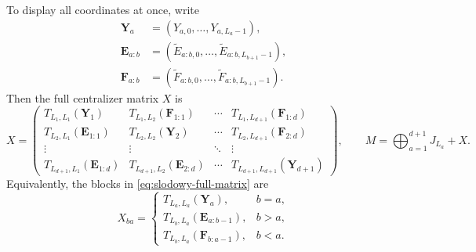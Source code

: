 \documentclass[12pt,a4paper]{article}
\begin{document}
To display all coordinates at once, write
\begin{equation}
 \begin{aligned}
 \mathbf Y_a&=(Y_{a,0},\ldots,Y_{a,L_a-1}),\\
 \mathbf E_{a:b}&=(\tilde{E}_{a:b,0},\ldots,\tilde{E}_{a:b,L_{b+1}-1}),\\
 \mathbf F_{a:b}&=(\tilde{F}_{a:b,0},\ldots,\tilde{F}_{a:b,L_{b+1}-1}).
 \end{aligned}
 \label{eq:slodowy-coordinate-vectors}
\end{equation}
Then the full centralizer matrix $X$ is
\begin{equation}
 X=\begin{pmatrix}
 T_{L_1,L_1}(\mathbf Y_1)&T_{L_1,L_2}(\mathbf F_{1:1})&\cdots&T_{L_1,L_{d+1}}(\mathbf F_{1:d})\\
 T_{L_2,L_1}(\mathbf E_{1:1})&T_{L_2,L_2}(\mathbf Y_2)&\cdots&T_{L_2,L_{d+1}}(\mathbf F_{2:d})\\
 \vdots&\vdots&\ddots&\vdots\\
 T_{L_{d+1},L_1}(\mathbf E_{1:d})&T_{L_{d+1},L_2}(\mathbf E_{2:d})&\cdots&T_{L_{d+1},L_{d+1}}(\mathbf Y_{d+1})
 \end{pmatrix},
 \qquad M=\bigoplus_{a=1}^{d+1}J_{L_a}+X.
 \label{eq:slodowy-full-matrix}
\end{equation}
Equivalently, the blocks in \eqref{eq:slodowy-full-matrix} are
\begin{equation}
 X_{ba}=\begin{cases}
 T_{L_a,L_a}(\mathbf Y_a),&b=a,\\
 T_{L_b,L_a}(\mathbf E_{a:b-1}),&b>a,\\
 T_{L_b,L_a}(\mathbf F_{b:a-1}),&b<a.
 \end{cases}
 \label{eq:slodowy-block-coordinates}
\end{equation}
\end{document}
